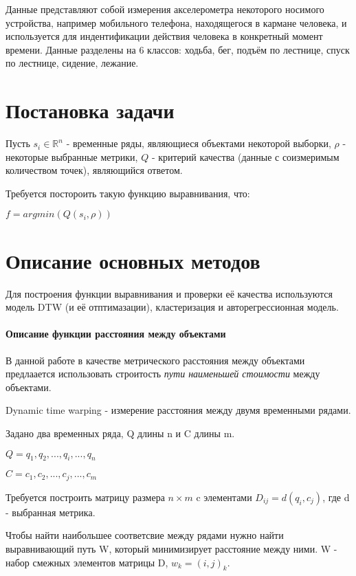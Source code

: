 \documentclass[12pt,twoside]{article}
\begin{document}
				Данные представляют собой измерения акселерометра некоторого носимого устройства, например мобильного телефона, находящегося в кармане человека, и используется для индентификации действия человека в конкретный момент времени. Данные разделены на 6 классов: ходьба, бег, подъём по лестнице, спуск по лестнице, сидение, лежание.
				
    \section{Постановка задачи}
		
				Пусть $s_i \in \mathbb{R}^n $ - временные ряды, являющиеся объектами некоторой выборки, $\rho$ - некоторые выбранные метрики, $Q$ - критерий качества (данные с соизмеримым количеством точек), являющийся ответом.
				
				Требуется постороить такую функцию выравнивания, что:
				
				$ f = argmin(Q(s_i, \rho))$
				
				\section{Описание основных методов}
				
				Для построения функции выравнивания и проверки её качества используются модель DTW (и её отптимазации), кластеризация и авторегрессионная модель.
				
				\paragraph{Описание функции расстояния между объектами}
				
				В данной работе в качестве метрического расстояния между объектами предлаается использовать строитость \textit{пути наименьшей стоимости} между объектами.
				
				Dynamic time warping - измерение расстояния между двумя временными рядами.
				
				Задано два временных ряда, Q длины n и C длины m.
				
				$Q=q_1,q_2, ..., q_i, ..., q_n $
				
				$C=c_1,c_2, ..., c_j, ..., c_m $
				
				Требуется построить матрицу размера $n\times m$ c элементами $D_{ij}=d(q_i, c_j)$, где d - выбранная метрика.
				
				Чтобы найти наибольшее соответсвие между рядами нужно найти выравнивающий путь W, который минимизирует расстояние между ними. W - набор смежных элементов матрицы D, $w_k = (i, j)_k$.
				
\end{document}
